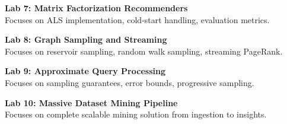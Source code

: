 \noindent\textbf{Lab 7: Matrix Factorization Recommenders} \\
Focuses on ALS implementation, cold-start handling, evaluation metrics.

\vspace{0.2cm}

\noindent\textbf{Lab 8: Graph Sampling and Streaming} \\
Focuses on reservoir sampling, random walk sampling, streaming PageRank.

\vspace{0.2cm}

\noindent\textbf{Lab 9: Approximate Query Processing} \\
Focuses on sampling guarantees, error bounds, progressive sampling.

\vspace{0.2cm}

\noindent\textbf{Lab 10: Massive Dataset Mining Pipeline} \\
Focuses on complete scalable mining solution from ingestion to insights.

\vspace{0.2cm}

\newpage
{}

